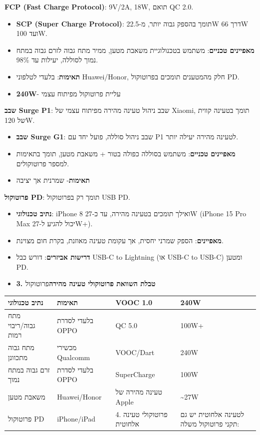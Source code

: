 \textbf{FCP (Fast Charge Protocol)}: 9V/2A, 18W, תואם QC 2.0.

\begin{itemize}
  \item \textbf{SCP (Super Charge Protocol)}: תומך בהספק גבוה יותר, מ-22.5W דרך 66W ועד 100W.
  \item \textbf{מאפיינים טכניים}: משתמש בטכנולוגיית משאבת מטען, ממיר מתח גבוה לזרם גבוה במתח נמוך לסוללה, יעילות עד 98\%.
  \item \textbf{תאימות}: בלעדי לטלפוני Huawei/Honor, חלק מהמטענים תומכים בפרוטוקול PD.
  \item \textbf{240W}- עליית פרוטוקול מפיתוח עצמי
\end{itemize}

\textbf{שבב Surge P1}: שבב ניהול טעינה מהירה מפיתוח עצמי של Xiaomi, תומך בטעינה קווית של 120W.

\begin{itemize}
  \item \textbf{שבב Surge G1}: שבב ניהול סוללה, פועל יחד עם P1 לטעינה מהירה יעילה יותר.
  \item \textbf{מאפיינים טכניים}: משתמש בסוללה כפולה בטור + משאבת מטען, תומך בתאימות למספר פרוטוקולים.
  \item \textbf{תאימות}- שמרנית אך יציבה
\end{itemize}

\textbf{פרוטוקול PD}: תומך רק בפרוטוקול USB PD.

\begin{itemize}
  \item \textbf{נתיב טכנולוגי}: iPhone 8 ואילך תומכים בטעינה מהירה, עד כ-27W (iPhone 15 Pro Max יכול להגיע ל-27W+).
  \item \textbf{מאפיינים}: הספק שמרני יחסית, אך עקומת טעינה מאוזנת, בקרת חום מצוינת.
  \item \textbf{דרישות אביזרים}: דורש כבל USB-C to Lightning (או USB-C to USB-C) ומטען PD.
  \item \textbf{3. טבלת השוואת פרוטוקולי טעינה מהירה}פרוטוקול
\end{itemize}


\begin{center}
\begin{tabularx}{\linewidth}{|X|X|X|X|}
\hline
\textbf{נתיב טכנולוגי} & \textbf{תאימות} & \textbf{VOOC 1.0} & \textbf{240W} \tabularnewline
\hline
מתח גבוה/ריבוי רמות & בלעדי לסדרת OPPO & QC 5.0 & 100W+ \tabularnewline
מתח גבוה מתכוונן & מכשירי Qualcomm & VOOC/Dart & 240W \tabularnewline
זרם גבוה במתח נמוך & בלעדי לסדרת OPPO & SuperCharge & 100W \tabularnewline
משאבת מטען & Huawei/Honor & טעינה מהירה של Apple & \textasciitilde{}27W \tabularnewline
פרוטוקול PD & iPhone/iPad & 4. פרוטוקולי טעינה אלחוטית & לטעינה אלחוטית יש גם תקני פרוטוקול משלה: \tabularnewline
\hline
\end{tabularx}
\end{center}

